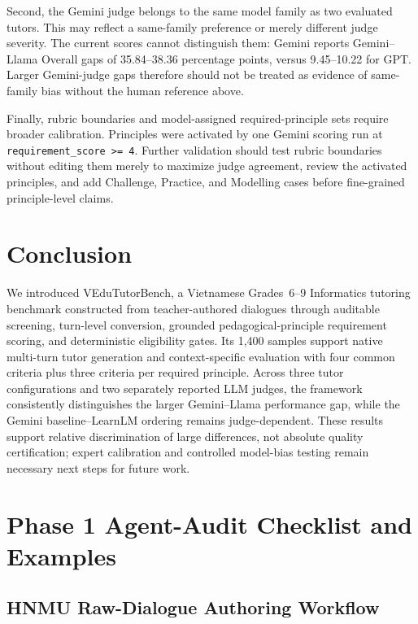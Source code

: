 \documentclass[conference]{IEEEtran}
\newcommand{\benchmarkname}{VEduTutorBench}
\begin{document}
Second, the Gemini judge belongs to the same model family as two evaluated
tutors. This may reflect a same-family preference or merely different judge
severity. The current scores cannot distinguish them: Gemini reports
Gemini--Llama Overall gaps of 35.84--38.36 percentage points, versus
9.45--10.22 for GPT. Larger Gemini-judge gaps therefore should not be treated
as evidence of same-family bias without the human reference above.

Finally, rubric boundaries and model-assigned required-principle sets require
broader calibration. Principles were activated by one Gemini scoring run at
\texttt{requirement\_score >= 4}. Further validation should test rubric
boundaries without editing them merely to maximize judge agreement, review the
activated principles, and add Challenge, Practice, and Modelling cases before
fine-grained principle-level claims.

\section{Conclusion}

We introduced \benchmarkname, a Vietnamese Grades~6--9 Informatics tutoring
benchmark constructed from teacher-authored dialogues through auditable
screening, turn-level conversion, grounded pedagogical-principle requirement scoring,
and deterministic eligibility gates. Its 1,400 samples support native
multi-turn tutor generation and context-specific evaluation with four common
criteria plus three criteria per required principle. Across three tutor
configurations and two separately reported LLM judges, the framework
consistently distinguishes the larger Gemini--Llama performance gap, while the
Gemini baseline--LearnLM ordering remains judge-dependent. These results
support relative discrimination of large differences, not absolute quality
certification; expert calibration and controlled model-bias testing remain
necessary next steps for future work.




\clearpage
\onecolumn
\appendices
\section{Phase 1 Agent-Audit Checklist and Examples}
\label{app:checklist}

\subsection{HNMU Raw-Dialogue Authoring Workflow}
\label{app:raw-dialogue-authoring}
\end{document}
